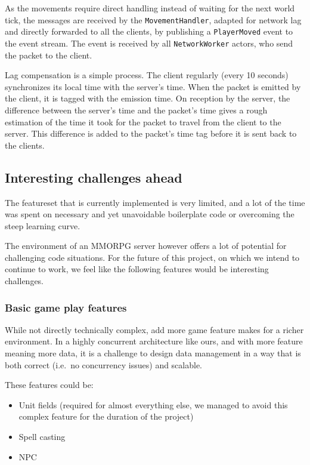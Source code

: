 \documentclass[paper=a4, fontsize=11pt]{scrartcl}
\begin{document}
As the movements require direct handling instead of waiting for the next world
tick, the messages are received by the \texttt{MovementHandler}, adapted for
network lag and directly forwarded to all the clients, by publishing a
\texttt{PlayerMoved} event to the event stream.
The event is received by all \texttt{NetworkWorker} actors, who send the packet
to the client.

Lag compensation is a simple process.
The client regularly (every 10 seconds) synchronizes its local time with the
server's time.
When the packet is emitted by the client, it is tagged with the emission time.
On reception by the server, the difference between the server's time and the
packet's time gives a rough estimation of the time it took for the packet to
travel from the client to the server. 
This difference is added to the packet's time tag before it is sent back to
the clients.

\subsection{Interesting challenges ahead}

The featureset that is currently implemented is very limited, and a lot of the
time was spent on necessary and yet unavoidable boilerplate code or overcoming
the steep learning curve.

The environment of an MMORPG server however offers a lot of potential for
challenging code situations.
For the future of this project, on which we intend to continue to work, we
feel like the following features would be interesting challenges.

\subsubsection{Basic game play features}

While not directly technically complex, add more game feature makes for a
richer environment. In a highly concurrent architecture like ours, and with more
feature meaning more data, it is a challenge to design data management in a way
that is both correct (i.e.\ no concurrency issues) and scalable.

These features could be:
\begin{itemize}
    \item Unit fields (required for almost everything else, we managed to avoid
        this complex feature for the duration of the project)
    \item Spell casting
    \item \gls{NPC}
\end{itemize}
\end{document}
